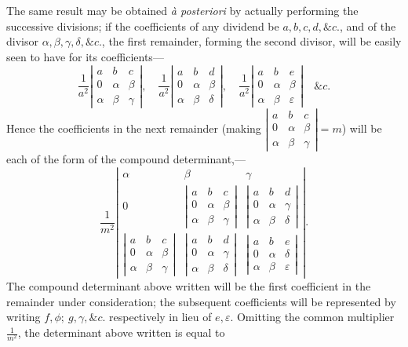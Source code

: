 \documentclass[11pt]{article}
\newcommand{\sdet}[1]{\left|\begin{smallmatrix}#1\end{smallmatrix}\right|}
\begin{document}
The same result may be obtained \emph{à posteriori} by actually performing the successive divisions; if the coefficients of any dividend be $a,b,c,d,\&c.$, and of the divisor $\alpha,\beta,\gamma,\delta,\&c.$, the first remainder, forming the second divisor, will be easily seen to have for its coefficients---
\[
\frac1{a^2}
\sdet{a&b&c\\0&\alpha&\beta\\ \alpha&\beta&\gamma},
\quad
\frac1{a^2}
\sdet{a&b&d\\0&\alpha&\beta\\ \alpha&\beta&\delta},
\quad
\frac1{a^2}
\sdet{a&b&e\\0&\alpha&\beta\\ \alpha&\beta&\varepsilon}
\quad\&c.
\]
Hence the coefficients in the next remainder (making
$\sdet{a&b&c\\0&\alpha&\beta\\ \alpha&\beta&\gamma}=m$)
will be each of the form of the compound determinant,---
\[
\frac1{m^2}
\left|\begin{array}{ccc}
\alpha&\beta&\gamma\\[0.3em]
0&
\sdet{a&b&c\\0&\alpha&\beta\\ \alpha&\beta&\gamma}&
\sdet{a&b&d\\0&\alpha&\gamma\\ \alpha&\beta&\delta}\\[1.1em]
\sdet{a&b&c\\0&\alpha&\beta\\ \alpha&\beta&\gamma}&
\sdet{a&b&d\\0&\alpha&\gamma\\ \alpha&\beta&\delta}&
\sdet{a&b&e\\0&\alpha&\delta\\ \alpha&\beta&\varepsilon}
\end{array}\right|.
\]
The compound determinant above written will be the first coefficient in the remainder under consideration; the subsequent coefficients will be represented by writing $f,\phi;\ g,\gamma,\&c.$ respectively in lieu of $e,\varepsilon$. Omitting the common multiplier $\frac1{m^2}$, the determinant above written is equal to
\end{document}
